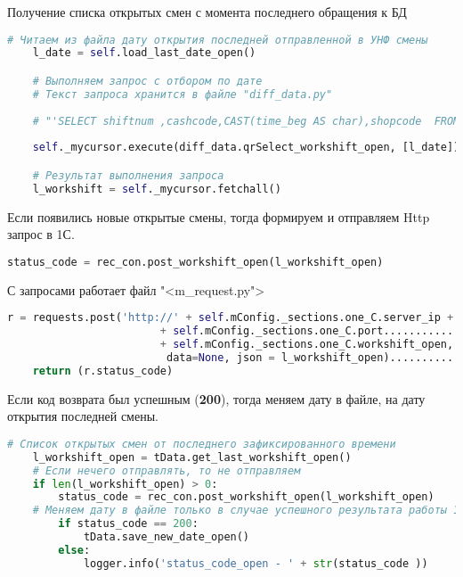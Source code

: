 \begin{itemize}
\newpage
Получение списка открытых смен с момента последнего обращения к БД
\newline
	\begin{lstlisting}[language=Python, caption=Смены из БД]
	# Читаем из файла дату открытия последней отправленной в УНФ смены
	l_date = self.load_last_date_open()

	# Выполняем запрос с отбором по дате
	# Текст запроса хранится в файле "diff_data.py"
	
	# "'SELECT shiftnum ,cashcode,CAST(time_beg AS char),shopcode  FROM workshift WHERE time_end IS NULL AND time_beg >%s  '"
	
	self._mycursor.execute(diff_data.qrSelect_workshift_open, [l_date])

	# Результат выполнения запроса
	l_workshift = self._mycursor.fetchall()
		\end{lstlisting}



 Если появились новые открытые смены, тогда формируем и отправляем Http запрос в 1С. 
\newline
\begin{lstlisting}[language=Python, caption=Http-запрос]
	status_code = rec_con.post_workshift_open(l_workshift_open)
\end{lstlisting}
С запросами работает файл "<m\_request.py"> 
\newline
\begin{lstlisting}[language=Python, caption=Текст Http-запроса]
	r = requests.post('http://' + self.mConfig._sections.one_C.server_ip + ':'..... IP адрес 
						+ self.mConfig._sections.one_C.port........................................Port
						+ self.mConfig._sections.one_C.workshift_open,.................... Процедура
						 data=None, json = l_workshift_open)................................... Данные смен ККМ
	return (r.status_code)
\end{lstlisting} 
 
Если код возврата был успешным (\textbf{200}), тогда меняем дату в файле, на дату открытия последней смены.
\newline

	\begin{lstlisting}[language=Python, caption=Обработка результата]
 # Список открытых смен от последнего зафиксированного времени
	l_workshift_open = tData.get_last_workshift_open()
	# Если нечего отправлять, то не отправляем
	if len(l_workshift_open) > 0:
		status_code = rec_con.post_workshift_open(l_workshift_open)
	# Меняем дату в файле только в случае успешного результата работы 1C
		if status_code == 200:
			tData.save_new_date_open()
		else:
			logger.info('status_code_open - ' + str(status_code ))
	\end{lstlisting}



\end{itemize}
